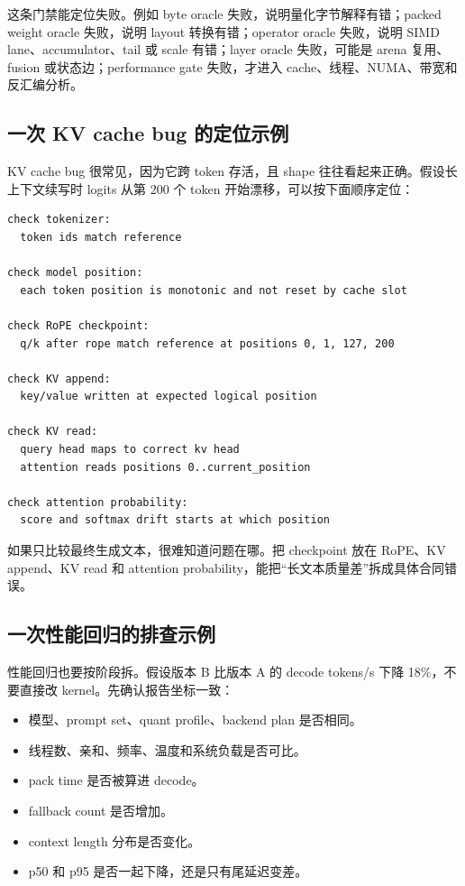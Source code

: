 这条门禁能定位失败。例如 byte oracle 失败，说明量化字节解释有错；packed weight oracle 失败，说明 layout 转换有错；operator oracle 失败，说明 SIMD lane、accumulator、tail 或 scale 有错；layer oracle 失败，可能是 arena 复用、fusion 或状态边；performance gate 失败，才进入 cache、线程、NUMA、带宽和反汇编分析。

\subsection{一次 KV cache bug 的定位示例}

KV cache bug 很常见，因为它跨 token 存活，且 shape 往往看起来正确。假设长上下文续写时 logits 从第 200 个 token 开始漂移，可以按下面顺序定位：

\begin{lstlisting}[numbers=none,caption={KV cache 漂移定位流程}]
check tokenizer:
  token ids match reference

check model position:
  each token position is monotonic and not reset by cache slot

check RoPE checkpoint:
  q/k after rope match reference at positions 0, 1, 127, 200

check KV append:
  key/value written at expected logical position

check KV read:
  query head maps to correct kv head
  attention reads positions 0..current_position

check attention probability:
  score and softmax drift starts at which position
\end{lstlisting}

如果只比较最终生成文本，很难知道问题在哪。把 checkpoint 放在 RoPE、KV append、KV read 和 attention probability，能把“长文本质量差”拆成具体合同错误。

\subsection{一次性能回归的排查示例}

性能回归也要按阶段拆。假设版本 B 比版本 A 的 decode tokens/s 下降 18\%，不要直接改 kernel。先确认报告坐标一致：

\begin{itemize}
  \item 模型、prompt set、quant profile、backend plan 是否相同。
  \item 线程数、亲和、频率、温度和系统负载是否可比。
  \item pack time 是否被算进 decode。
  \item fallback count 是否增加。
  \item context length 分布是否变化。
  \item p50 和 p95 是否一起下降，还是只有尾延迟变差。
\end{itemize}

